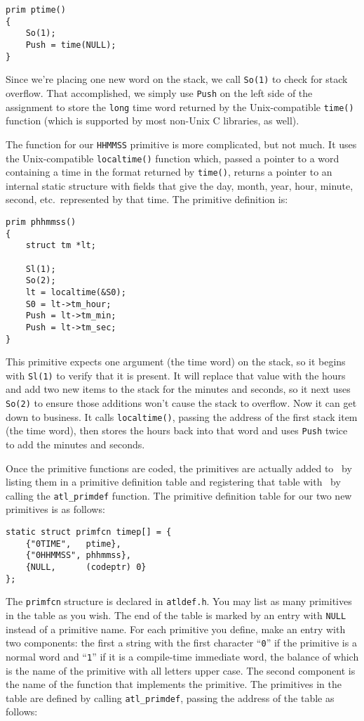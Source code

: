 \documentclass[twocolumn]{article}
\begin{document}
\begin{verbatim}
prim ptime()
{
    So(1);
    Push = time(NULL);
}
\end{verbatim}

Since we're placing one new word on the stack, we call {\tt So(1)} to
check for stack overflow.  That accomplished, we simply use {\tt Push}
on the left side of the assignment to store the {\tt long} time word
returned by the Unix-compatible {\tt time()} function (which is
supported by most non-Unix C libraries, as well).

The function for our {\tt HHMMSS} primitive is more complicated, but
not much.  It uses the Unix-compatible {\tt localtime()} function
which, passed a pointer to a word containing a time in the format
returned by {\tt time()}, returns a pointer to an internal static
structure with fields that give the day, month, year, hour, minute,
second, etc.\ represented by that time.  The primitive definition is:

\begin{verbatim}
prim phhmmss()
{
    struct tm *lt;

    Sl(1);
    So(2);
    lt = localtime(&S0);
    S0 = lt->tm_hour;
    Push = lt->tm_min;
    Push = lt->tm_sec;
}
\end{verbatim}

This primitive expects one argument (the time word) on the stack, so
it begins with {\tt Sl(1)} to verify that it is present.  It will
replace that value with the hours and add two new items to the stack
for the minutes and seconds, so it next uses {\tt So(2)} to ensure
those additions won't cause the stack to overflow.  Now it can get
down to business.  It calls {\tt localtime()}, passing the address of
the first stack item (the time word), then stores the hours back into
that word and uses {\tt Push} twice to add the minutes and seconds.

Once the primitive functions are coded, the primitives are actually
added to \atlast\ by listing them in a primitive definition table and
registering that table with \atlast\ by calling the \verb+atl_primdef+
function.  The primitive definition table for our two new primitives
is as follows:

\begin{verbatim}
static struct primfcn timep[] = {
    {"0TIME",   ptime},
    {"0HHMMSS", phhmmss},
    {NULL,      (codeptr) 0}
};
\end{verbatim}

The {\tt primfcn} structure is declared in {\tt atldef.h}.  You may
list as many primitives in the table as you wish.  The end of the
table is marked by an entry with {\tt NULL} instead of a primitive
name.  For each primitive you define, make an entry with two components:
the first a string with the first character ``{\tt 0}'' if the
primitive is a normal word and ``{\tt 1}'' if it is a compile-time
immediate word, the balance of which is the name of the
primitive with all letters upper case.  The second component
is the name of the function that implements the primitive.
The primitives in the table are defined by calling
\verb+atl_primdef+, passing the address of the table as follows:
\end{document}
